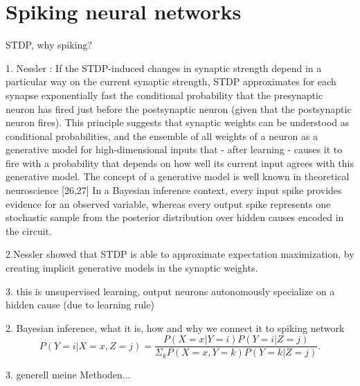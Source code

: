 \section{Spiking neural networks}

STDP, why spiking?






1. Nessler : If the STDP-induced changes in
synaptic strength depend in a particular way on the current
synaptic strength, STDP approximates for each synapse exponentially fast the conditional probability that the presynaptic neuron
has fired just before the postsynaptic neuron (given that the
postsynaptic neuron fires). This principle suggests that synaptic
weights can be understood as conditional probabilities, and the
ensemble of all weights of a neuron as a generative model for high-dimensional inputs that - after learning - causes it to fire with a
probability that depends on how well its current input agrees with
this generative model. The concept of a generative model is well
known in theoretical neuroscience [26,27]
 In a Bayesian inference context, every input
spike provides evidence for an observed variable, whereas every
output spike represents one stochastic sample from the posterior
distribution over hidden causes encoded in the circuit.

2.Nessler showed that STDP is able to approximate expectation maximization, by creating implicit generative models in the synaptic weights.

3. this is unsupervised learning, output neurons autonomously specialize on a hidden cause (due to learning rule)

2. Bayesian inference, what it is, how and why we connect it to spiking network
\begin{equation}
\label{eqn:pYvorausgesetztXUndZ}
P(Y = i|X = x, Z = j) = \frac{P(X=x|Y=i)P(Y = i|Z = j)}{\Sigma_{k}P(X=x,Y=k)P(Y=k|Z=j)}.
\end{equation}


3. generell meine Methoden...